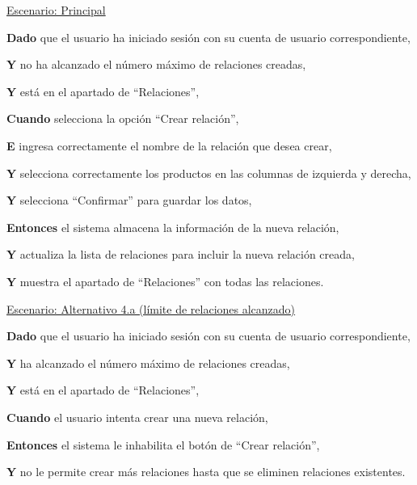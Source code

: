 \underline{Escenario: Principal}\par
\vspace{0.15cm}
\textbf{Dado} que el usuario ha iniciado sesión con su cuenta de usuario correspondiente,\par
\textbf{Y} no ha alcanzado el número máximo de relaciones creadas,\par
\textbf{Y} está en el apartado de \enquote{Relaciones},\par
\textbf{Cuando} selecciona la opción \enquote{Crear relación},\par
\textbf{E} ingresa correctamente el nombre de la relación que desea crear,\par
\textbf{Y} selecciona correctamente los productos en las columnas de izquierda y derecha,\par
\textbf{Y} selecciona \enquote{Confirmar} para guardar los datos,\par
\textbf{Entonces} el sistema almacena la información de la nueva relación,\par
\textbf{Y} actualiza la lista de relaciones para incluir la nueva relación creada,\par
\textbf{Y} muestra el apartado de \enquote{Relaciones} con todas las relaciones.\par

\vspace{0.20cm}

\underline{Escenario: Alternativo 4.a (límite de relaciones alcanzado)}\par
\vspace{0.15cm}
\textbf{Dado} que el usuario ha iniciado sesión con su cuenta de usuario correspondiente,\par
\textbf{Y} ha alcanzado el número máximo de relaciones creadas,\par
\textbf{Y} está en el apartado de \enquote{Relaciones},\par
\textbf{Cuando} el usuario intenta crear una nueva relación,\par
\textbf{Entonces} el sistema le inhabilita el botón de \enquote{Crear relación},\par
\textbf{Y} no le permite crear más relaciones hasta que se eliminen relaciones existentes.\par

\newpage %

